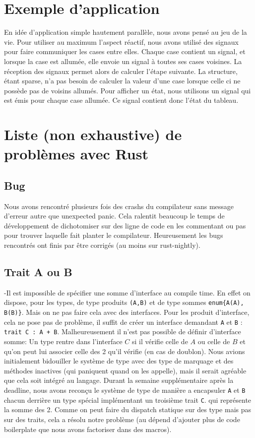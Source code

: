 \documentclass[a4paper]{article}
\renewcommand{\(}{\left(}
\renewcommand{\)}{\right)}
\begin{document}
\section{Exemple d'application}

En idée d'application simple hautement parallèle, nous avons pensé au jeu de la
vie. Pour utiliser au maximum l'aspect réactif, nous avons utilisé des signaux
pour faire communiquer les cases entre elles. Chaque case contient un signal, et
lorsque la case est allumée, elle envoie un signal à toutes ses cases voisines.
La réception des signaux permet alors de calculer l'étape suivante. La
structure, étant sparse, n'a pas besoin de calculer la valeur d'une case lorsque
celle ci ne possède pas de voisins allumés. Pour afficher un état, nous
utilisons un signal qui est émis pour chaque case allumée. Ce signal contient
donc l'état du tableau.


\section{Liste (non exhaustive) de problèmes avec Rust}
\subsection{Bug}
Nous avons rencontré plusieurs fois des crashs du compilateur sans message d'erreur
autre que \og unexpected panic\fg{}. Cela ralentit beaucoup le temps de
développement de dichotomiser sur des ligne de code en les commentant ou pas
pour trouver laquelle fait planter le compilateur. Heureusement les bugs
rencontrés ont finis par être corrigés (au moins sur rust-nightly).


\subsection{Trait A ou B}
-Il est impossible de spécifier une somme d'interface au compile time. En effet
on dispose, pour les types, de type produits \verb!(A,B)! et de type sommes
\verb!enum{A(A), B(B)}!. Mais on ne pas faire cela avec des interfaces. Pour les
produit d'interface, cela ne pose pas de problème, il suffit de créer un
interface demandant \verb!A! et \verb!B! : \verb!trait C : A + B!.
Malheureusement il n'est pas possible de définir d'interface somme: Un type
rentre dans l'interface $C$ si il vérifie celle de $A$ ou celle de $B$ et qu'on
peut lui associer celle des 2 qu'il vérifie (en cas de doublon). Nous avions initialement
bidouiller le système de type avec des type de marquage et des méthodes
inactives (qui paniquent quand on les appelle), mais il serait agréable
que cela soit intégré au langage. Durant la semaine supplémentaire après la
deadline, nous avons reconçu le système de type de manière a encapsuler \verb!A!
et \verb!B! chacun derrière un type spécial implémentant un troisième trait
\verb!C!. qui représente la somme des 2. Comme on peut faire du dispatch
statique sur des type mais pas sur des traits, cela a résolu notre problème (au
dépend d'ajouter plus de code boilerplate que nous avons factoriser dans des macros).
\end{document}
